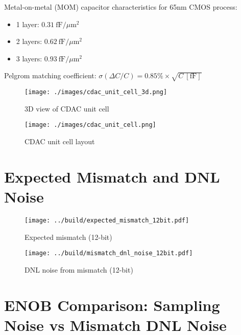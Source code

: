 \documentclass[11pt]{article}
\begin{document}
Metal-on-metal (MOM) capacitor characteristics for 65nm CMOS process:

\begin{itemize}
  \item 1 layer: $0.31~\mathrm{fF}/\mu\mathrm{m}^2$
  \item 2 layers: $0.62~\mathrm{fF}/\mu\mathrm{m}^2$
  \item 3 layers: $0.93~\mathrm{fF}/\mu\mathrm{m}^2$
\end{itemize}

Pelgrom matching coefficient: $\sigma(\Delta C/C) = 0.85\% \times \sqrt{C~[\mathrm{fF}]}$

\begin{figure}[htbp]
  \centering
  \begin{minipage}{0.48\textwidth}
    \centering
    \texttt{[image: ./images/cdac\_unit\_cell\_3d.png]}
    \caption{3D view of CDAC unit cell}
  \end{minipage}
  \hfill
  \begin{minipage}{0.48\textwidth}
    \centering
    \texttt{[image: ./images/cdac\_unit\_cell.png]}
    \caption{CDAC unit cell layout}
  \end{minipage}
\end{figure}

\section{Expected Mismatch and DNL Noise}

\begin{figure}[htbp]
  \centering
  \begin{minipage}{0.48\textwidth}
    \centering
    \texttt{[image: ../build/expected\_mismatch\_12bit.pdf]}
    \caption{Expected mismatch (12-bit)}
  \end{minipage}
  \hfill
  \begin{minipage}{0.48\textwidth}
    \centering
    \texttt{[image: ../build/mismatch\_dnl\_noise\_12bit.pdf]}
    \caption{DNL noise from mismatch (12-bit)}
  \end{minipage}
\end{figure}

\section{ENOB Comparison: Sampling Noise vs Mismatch DNL Noise}
\end{document}
